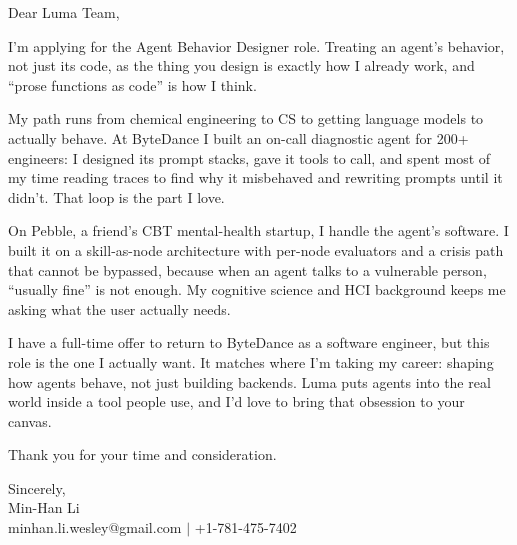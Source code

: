 \documentclass[letterpaper,11pt]{article}
\begin{document}
Dear Luma Team,

I'm applying for the Agent Behavior Designer role. Treating an agent's behavior, not just its code, as the thing you design is exactly how I already work, and ``prose functions as code'' is how I think.

My path runs from chemical engineering to CS to getting language models to actually behave. At ByteDance I built an on-call diagnostic agent for 200+ engineers: I designed its prompt stacks, gave it tools to call, and spent most of my time reading traces to find why it misbehaved and rewriting prompts until it didn't. That loop is the part I love.

On Pebble, a friend's CBT mental-health startup, I handle the agent's software. I built it on a skill-as-node architecture with per-node evaluators and a crisis path that cannot be bypassed, because when an agent talks to a vulnerable person, ``usually fine'' is not enough. My cognitive science and HCI background keeps me asking what the user actually needs.

I have a full-time offer to return to ByteDance as a software engineer, but this role is the one I actually want. It matches where I'm taking my career: shaping how agents behave, not just building backends. Luma puts agents into the real world inside a tool people use, and I'd love to bring that obsession to your canvas.

Thank you for your time and consideration.

\vspace{6pt}

Sincerely, \\
Min-Han Li \\
minhan.li.wesley@gmail.com $|$ +1-781-475-7402
\end{document}
